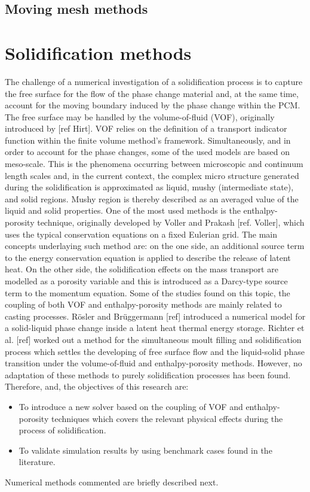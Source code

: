 \subsection*{Moving mesh methods}

\section{Solidification methods}
The challenge of a numerical investigation of a solidification process is to capture the free surface for the flow of the phase change material and, at the same time, account for the moving boundary induced by the phase change within the PCM. The free surface may be handled by the volume-of-fluid (VOF), originally introduced by [ref Hirt]. VOF relies on the definition of a transport indicator function within the finite volume method's framework.
Simultaneously, and in order to account for the phase changes, some of the used models are based on meso-scale. This is the phenomena occurring between microscopic and continuum length scales and, in the current context, the complex micro structure generated during the solidification is approximated as liquid, mushy (intermediate state), and solid regions. Mushy region is thereby described as an averaged value of the liquid and solid properties.
\newline
\indent One of the most used methods is the enthalpy-porosity technique, originally developed by Voller and Prakash [ref. Voller], which uses the typical conservation equations on a fixed Eulerian grid. The main concepts underlaying such method are: on the one side, an additional source term to the energy conservation equation is applied to describe the release of latent heat. On the other side, the solidification effects on the mass transport are modelled as a porosity variable and this is introduced as a Darcy-type source term to the momentum equation.
\newline
\indent Some of the studies found on this topic, the coupling of both VOF and enthalpy-porosity methods are mainly related to casting processes. Rösler and Brüggermann [ref] introduced a numerical model for a solid-liquid phase change inside a latent heat thermal energy storage. Richter et al. [ref] worked out a method for the simultaneous moult filling and solidification process which settles the developing of free surface flow and the liquid-solid phase transition under the volume-of-fluid and enthalpy-porosity methods.
However, no adaptation of these methods to purely solidification processes has been found. Therefore, and, the objectives of this research are:
\begin{itemize}
	\item To introduce a new solver based on the coupling of VOF and enthalpy-porosity techniques which covers the relevant physical effects during the process of solidification.
	\item	To validate simulation results by using benchmark cases found in the literature.
\end{itemize}
Numerical methods commented are briefly described next.

